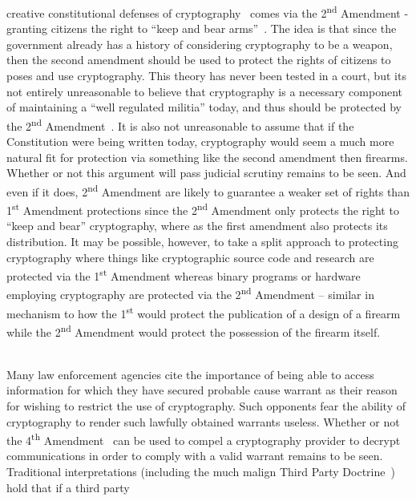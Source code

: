 \begin{packed_desc}
  creative constitutional defenses of cryptography~\cite{xkcd-504}
  comes via the 2\textsuperscript{nd} Amendment - granting citizens
  the right to ``keep and bear
  arms''~\cite{us-constitution-amend2}. The idea is that since the
  government already has a history of considering cryptography to be a
  weapon, then the second amendment should be used to protect the
  rights of citizens to poses and use cryptography. This theory has
  never been tested in a court, but its not entirely unreasonable to
  believe that cryptography is a necessary component of maintaining a
  ``well regulated militia'' today, and thus should be protected by
  the 2\textsuperscript{nd} Amendment~\cite{scotus-usvmiller-guns}. It
  is also not unreasonable to assume that if the Constitution were
  being written today, cryptography would seem a much more natural fit
  for protection via something like the second amendment then
  firearms. Whether or not this argument will pass judicial scrutiny
  remains to be seen. And even if it does, 2\textsuperscript{nd}
  Amendment are likely to guarantee a weaker set of rights than
  1\textsuperscript{st} Amendment protections since the
  2\textsuperscript{nd} Amendment only protects the right to ``keep
  and bear'' cryptography, where as the first amendment also protects
  its distribution. It may be possible, however, to take a split
  approach to protecting cryptography where things like cryptographic
  source code and research are protected via the 1\textsuperscript{st}
  Amendment whereas binary programs or hardware employing cryptography
  are protected via the 2\textsuperscript{nd} Amendment -- similar in
  mechanism to how the 1\textsuperscript{st} would protect the
  publication of a design of a firearm while the 2\textsuperscript{nd}
  Amendment would protect the possession of the firearm itself.
\item[4\textsuperscript{th} Amendment] \hfill \\ Many law enforcement
  agencies cite the importance of being able to access information for
  which they have secured probable cause warrant as their reason for
  wishing to restrict the use of cryptography. Such opponents fear the
  ability of cryptography to render such lawfully obtained warrants
  useless. Whether or not the 4\textsuperscript{th}
  Amendment~\cite{us-constitution-amend4} can be used to compel a
  cryptography provider to decrypt communications in order to comply
  with a valid warrant remains to be seen. Traditional interpretations
  (including the much malign Third Party
  Doctrine~\cite{thompson-thirdparty}) hold that if a third party

\end{packed_desc}
